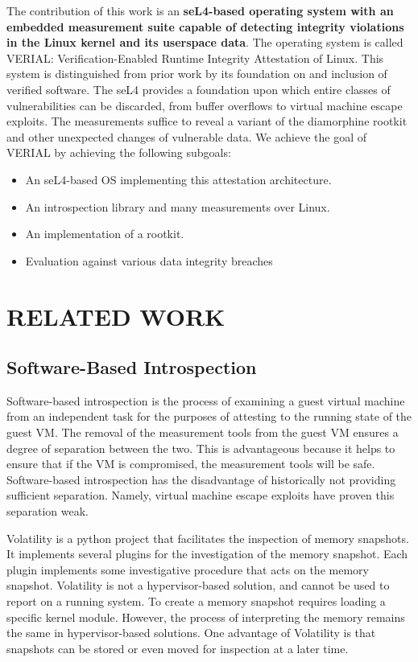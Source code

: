 \documentclass[a4paper,twoside]{article}
\begin{document}
The contribution of this work is an \textbf{seL4-based operating system with an embedded measurement suite capable of detecting integrity violations in the Linux kernel and its userspace data}. The operating system is called VERIAL: Verification-Enabled Runtime Integrity Attestation of Linux. This system is distinguished from prior work by its foundation on and inclusion of verified software. The seL4 provides a foundation upon which entire classes of vulnerabilities can be discarded, from buffer overflows to virtual machine escape exploits. The measurements suffice to reveal a variant of the diamorphine \cite{diamorphine} rootkit and other unexpected changes of vulnerable data. We achieve the goal of VERIAL by achieving the following subgoals:

\begin{itemize}
\item An seL4-based OS implementing this attestation architecture.
\item An introspection library and many measurements over Linux.
\item An implementation of a rootkit.
\item Evaluation against various data integrity breaches
\end{itemize}

\section{\uppercase{Related Work}} %

\subsection{Software-Based Introspection}
Software-based introspection is the process of examining a guest virtual machine from an independent task for the purposes of attesting to the running state of the guest VM. The removal of the measurement tools from the guest VM ensures a degree of separation between the two. This is advantageous because it helps to ensure that if the VM is compromised, the measurement tools will be safe. Software-based introspection has the disadvantage of historically not providing sufficient separation. Namely, virtual machine escape exploits have proven this separation weak.

Volatility \cite{Volatility} is a python project that facilitates the inspection of memory snapshots. It implements several plugins for the investigation of the memory snapshot. Each plugin implements some investigative procedure that acts on the memory snapshot. Volatility is not a hypervisor-based solution, and cannot be used to report on a running system. To create a memory snapshot requires loading a specific kernel module. However, the process of interpreting the memory remains the same in hypervisor-based solutions. One advantage of Volatility is that snapshots can be stored or even moved for inspection at a later time.
\end{document}
